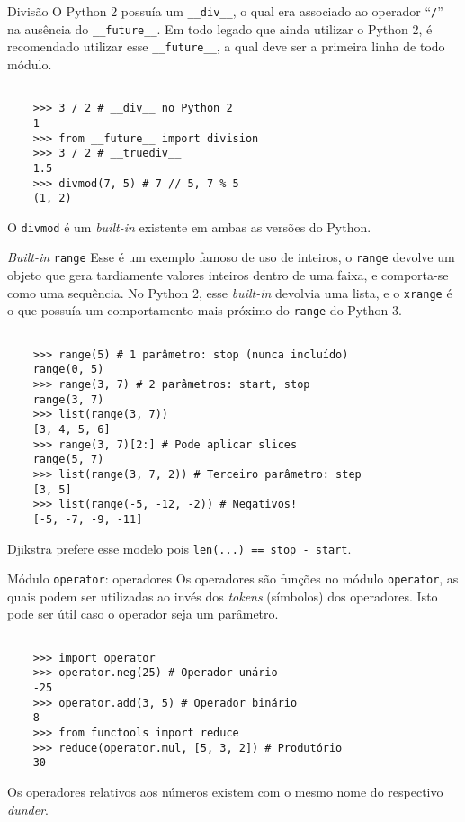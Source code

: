 \documentclass[utf8]{beamer}
\begin{document}
\begin{frame}[fragile]{Divisão}
  O Python 2 possuía um \texttt{__div__},
  o qual era associado ao operador ``\texttt{/}''
  na ausência do \texttt{__future__}.
  Em todo legado que ainda utilizar o Python 2,
  é recomendado utilizar esse \texttt{__future__},
  a qual deve ser a primeira linha de todo módulo.

  \begin{verbatim}

    >>> 3 / 2 # __div__ no Python 2
    1
    >>> from __future__ import division
    >>> 3 / 2 # __truediv__
    1.5
    >>> divmod(7, 5) # 7 // 5, 7 % 5
    (1, 2)

  \end{verbatim}

  O \texttt{divmod} é um \emph{built-in}
  existente em ambas as versões do Python.

\end{frame}


\begin{frame}[fragile]{\emph{Built-in} \texttt{range}}
  Esse é um exemplo famoso de uso de inteiros,
  o \texttt{range} devolve um objeto que gera
  tardiamente valores inteiros dentro de uma faixa,
  e comporta-se como uma sequência.
  No Python 2, esse \emph{built-in} devolvia uma lista,
  e o \texttt{xrange} é o que possuía um comportamento
  mais próximo do \texttt{range} do Python 3.

  \begin{verbatim}

    >>> range(5) # 1 parâmetro: stop (nunca incluído)
    range(0, 5)
    >>> range(3, 7) # 2 parâmetros: start, stop
    range(3, 7)
    >>> list(range(3, 7))
    [3, 4, 5, 6]
    >>> range(3, 7)[2:] # Pode aplicar slices
    range(5, 7)
    >>> list(range(3, 7, 2)) # Terceiro parâmetro: step
    [3, 5]
    >>> list(range(-5, -12, -2)) # Negativos!
    [-5, -7, -9, -11]

  \end{verbatim}

  Djikstra prefere esse modelo pois
  \texttt{len(...) == stop - start}.
\end{frame}


\begin{frame}[fragile]{Módulo \texttt{operator}: operadores}
  Os operadores são funções no módulo \texttt{operator},
  as quais podem ser utilizadas
  ao invés dos \emph{tokens} (símbolos) dos operadores.
  Isto pode ser útil caso o operador seja um parâmetro.

  \begin{verbatim}

    >>> import operator
    >>> operator.neg(25) # Operador unário
    -25
    >>> operator.add(3, 5) # Operador binário
    8
    >>> from functools import reduce
    >>> reduce(operator.mul, [5, 3, 2]) # Produtório
    30

  \end{verbatim}

  Os operadores relativos aos números existem com o mesmo nome do
  respectivo \emph{dunder}.
\end{frame}
\end{document}
